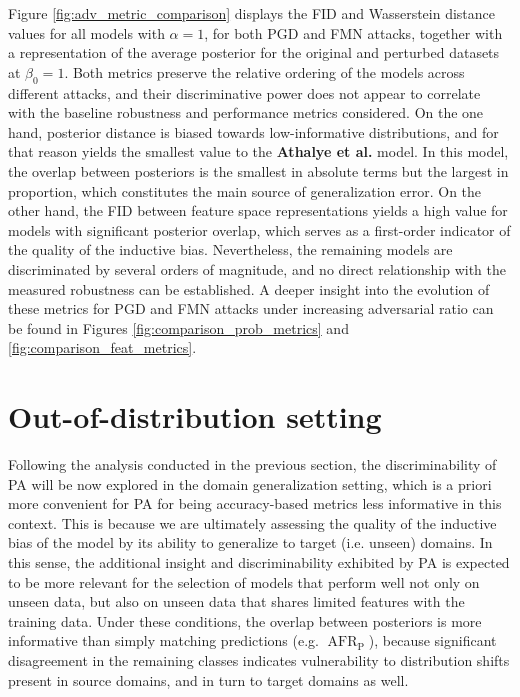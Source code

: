 Figure \ref{fig:adv_metric_comparison} displays the FID and Wasserstein distance values for
all models with $\alpha=1$, for both PGD and FMN attacks, together with a representation
of the average posterior for the original and perturbed datasets
at $\beta_0 = 1$. Both metrics preserve the relative ordering of the models across different attacks, 
and their discriminative power does not appear to correlate with the baseline robustness 
and performance metrics considered. On the one hand, posterior distance is biased
towards low-informative distributions, and for that reason yields the smallest value to 
the {\color{tab:green} \textbf{Athalye et al.}} model. In this model, the overlap between
posteriors is the smallest in absolute terms but the largest in proportion, which constitutes the
main source of generalization error. On the other hand, the FID between feature 
space representations yields a high value for models with significant posterior overlap, 
which serves as a first-order indicator of the quality of the 
inductive bias. Nevertheless, the remaining models are discriminated by several orders 
of magnitude, and no direct relationship with the measured robustness can be established. A 
deeper insight into the evolution of these metrics for PGD and FMN attacks under increasing
adversarial ratio can be found in Figures \ref{fig:comparison_prob_metrics} and 
\ref{fig:comparison_feat_metrics}. \\


\section{Out-of-distribution setting}\label{results_domain_generalization}

Following the analysis conducted in the previous section, the discriminability of PA
will be now explored in the domain generalization setting, which is a priori more convenient
for PA for being accuracy-based metrics less informative in this context. This is because
we are ultimately assessing the quality of the inductive bias of the model
by its ability to generalize to target (i.e. unseen) domains. In this sense, the additional
insight and discriminability exhibited by PA is expected to be more relevant for the selection of
models that perform well not only on unseen data, but also on unseen data that shares limited 
features with the training data. Under these conditions, the overlap between posteriors is more
informative than simply matching predictions (e.g. $\operatorname{AFR}_{\text{P}}$), because 
significant disagreement in
the remaining classes indicates vulnerability to distribution shifts present in
source domains, and in turn to target domains as well. \\

